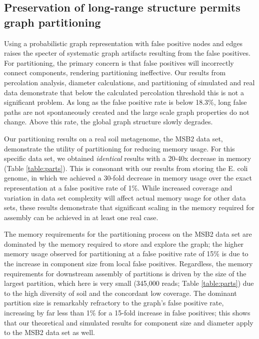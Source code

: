 \documentclass{pnastwo}
\begin{document}
\begin{article}
\subsection{Preservation of long-range structure permits graph partitioning}

Using a probabilistic graph representation with false positive nodes
and edges raises the specter of systematic graph artifacts resulting
from the false positives.  For partitioning, the primary concern is that false
positives will incorrectly connect components, rendering partitioning
ineffective.  Our results from percolation analysis, diameter
calculations, and partitioning of simulated and real data demonstrate that
below the calculated percolation threshold this is not a significant
problem.  As long as the false positive rate is below 18.3\%,
long false paths are not spontaneously created and the
large scale graph properties do not change.  Above this rate, the global
graph structure slowly degrades.

Our partitioning results on a real soil metagenome, the MSB2 data set,
demonstrate the utility of partitioning for reducing memory usage.
For this specific data set, we obtained {\em identical} results with a
20-40x decrease in memory (Table \ref{table:parts}).  This is consonant with our results from
storing the E. coli genome, in which we achieved a 30-fold decrease
in memory usage over the exact representation at a false positive rate
of 1\%.  While increased coverage and variation in data set complexity
will affect actual memory usage for other data sets, these results demonstrate that
significant scaling in the memory required for assembly can be achieved
in at least one real case.

The memory requirements for the partitioning process on the MSB2 data
set are dominated by the memory required to store and explore the
graph; the higher memory usage observed for partitioning at a false positive rate
of 15\% is due to the increase in component size from local false
positives.  Regardless, the memory requirements for downstream assembly
of partitions is driven by the size of the largest partition, which
here is very small (345,000 reads; Table \ref{table:parts}) due to the
high diversity of soil and the concordant low coverage.  The
dominant partition size is remarkably refractory to the graph's false
positive rate, increasing by far less than 1\% for a 15-fold increase
in false positives; this shows that our theoretical and
simulated results for component size and diameter apply to the MSB2 data set
as well.


\end{article}
\end{document}
